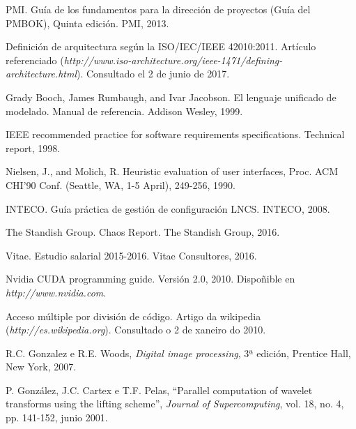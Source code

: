 

\begin{thebibliography}{99}
	
PMI. Guía de los fundamentos para la dirección de proyectos (Guía del PMBOK), Quinta edición. PMI, 2013. 	
	
 Definición de arquitectura según la ISO/IEC/IEEE 42010:2011. Artículo referenciado ({\it http://www.iso-architecture.org/ieee-1471/defining-architecture.html}). Consultado el 2 de junio de 2017.

Grady Booch, James Rumbaugh, and Ivar Jacobson. El lenguaje unificado de modelado. Manual
de referencia. Addison Wesley, 1999.

IEEE recommended practice for software requirements specifications. Technical report, 1998.

Nielsen, J., and Molich, R. Heuristic evaluation of user interfaces, Proc. ACM CHI'90 Conf. (Seattle, WA, 1-5 April), 249-256, 1990.

INTECO. Guía práctica de gestión de configuración LNCS. INTECO, 2008.

The Standish Group. Chaos Report. The Standish Group, 2016.

Vitae. Estudio salarial 2015-2016. Vitae Consultores, 2016.

	
 Nvidia CUDA programming guide. Versión 2.0, 2010. Dispoñible en {\it http://www.nvidia.com}.

 Acceso múltiple por división de código. Artigo da wikipedia ({\it http://es.wikipedia.org}). Consultado o 2 de xaneiro do 2010.

 R.C. Gonzalez e R.E. Woods, {\it Digital image processing}, 3ª edición, Prentice Hall, New York, 2007.

 P. González, J.C. Cartex e T.F. Pelas, ``Parallel computation of wavelet transforms using the lifting scheme'', {\it Journal of Supercomputing}, vol. 18, no. 4, pp. 141-152, junio 2001.
\end{thebibliography}

